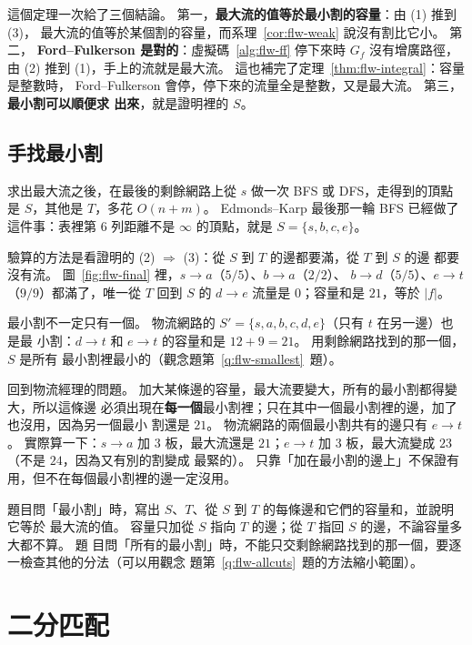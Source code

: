 這個定理一次給了三個結論。 第一，\textbf{最大流的值等於最小割的容量}：由 (1) 推到 (3)，
最大流的值等於某個割的容量，而系理~\ref{cor:flw-weak} 說沒有割比它小。 第二，
\textbf{Ford--Fulkerson 是對的}：虛擬碼~\ref{alg:flw-ff} 停下來時 $G_f$ 沒有增廣路徑，由
(2) 推到 (1)，手上的流就是最大流。 這也補完了定理~\ref{thm:flw-integral}：容量是整數時，
Ford--Fulkerson 會停，停下來的流量全是整數，又是最大流。 第三，\textbf{最小割可以順便求
出來}，就是證明裡的 $S$。

\subsection{手找最小割}
\label{sec:flw-mincut}

求出最大流之後，在最後的剩餘網路上從 $s$ 做一次 BFS 或 DFS，走得到的頂點是 $S$，其他是
$T$，多花 $O(n + m)$。 Edmonds--Karp 最後那一輪 BFS 已經做了這件事：表裡第 6 列距離不是
$\infty$ 的頂點，就是 $S = \{s, b, c, e\}$。

驗算的方法是看證明的 (2) $\Rightarrow$ (3)：從 $S$ 到 $T$ 的邊都要滿，從 $T$ 到 $S$ 的邊
都要沒有流。 圖~\ref{fig:flw-final} 裡，$s \to a$（$5/5$）、$b \to a$（$2/2$）、
$b \to d$（$5/5$）、$e \to t$（$9/9$）都滿了，唯一從 $T$ 回到 $S$ 的 $d \to e$ 流量是
$0$；容量和是 $21$，等於 $|f|$。

最小割不一定只有一個。 物流網路的 $S' = \{s, a, b, c, d, e\}$（只有 $t$ 在另一邊）也是最
小割：$d \to t$ 和 $e \to t$ 的容量和是 $12 + 9 = 21$。 用剩餘網路找到的那一個，$S$ 是所有
最小割裡最小的（觀念題第~\ref{q:flw-smallest}~題）。

回到物流經理的問題。 加大某條邊的容量，最大流要變大，所有的最小割都得變大，所以這條邊
必須出現在\textbf{每一個}最小割裡；只在其中一個最小割裡的邊，加了也沒用，因為另一個最小
割還是 $21$。 物流網路的兩個最小割共有的邊只有 $e \to t$。 實際算一下：$s \to a$ 加 $3$
板，最大流還是 $21$；$e \to t$ 加 $3$ 板，最大流變成 $23$（不是 $24$，因為又有別的割變成
最緊的）。 只靠「加在最小割的邊上」不保證有用，但不在每個最小割裡的邊一定沒用。

\begin{examnote}
題目問「最小割」時，寫出 $S$、$T$、從 $S$ 到 $T$ 的每條邊和它們的容量和，並說明它等於
最大流的值。 容量只加從 $S$ 指向 $T$ 的邊；從 $T$ 指回 $S$ 的邊，不論容量多大都不算。 題
目問「所有的最小割」時，不能只交剩餘網路找到的那一個，要逐一檢查其他的分法（可以用觀念
題第~\ref{q:flw-allcuts}~題的方法縮小範圍）。
\end{examnote}

\section{二分匹配}
\label{sec:flw-match}


